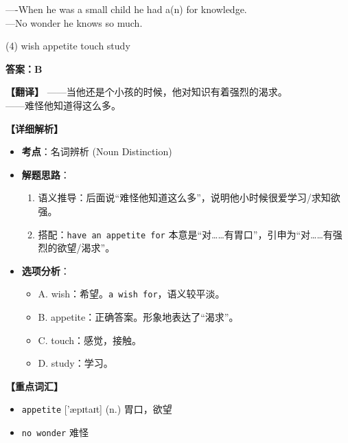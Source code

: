 \documentclass[11pt, a4paper]{article}
\newcommand{\analysis}[4]{
    \begin{solutionbox}
        \textbf{答案：#1}
        
        \textbf{【翻译】} #2
        
        \textbf{【详细解析】}
        #3
        
        \textbf{【重点词汇】}
        #4
    \end{solutionbox}
}
\newcommand{\blank}{\underline{\hspace{1.5cm}}}
\begin{document}
\begin{questions}
    \item ----When he was a small child he had a(n) \blank for knowledge. \\
    ---No wonder he knows so much.
    \begin{tasks}(4)
        \task wish \task appetite \task touch \task study
    \end{tasks}
    \analysis{B}{——当他还是个小孩的时候，他对知识有着强烈的渴求。\\——难怪他知道得这么多。}{
        \begin{itemize}
            \item \textbf{考点}：名词辨析 (Noun Distinction)
            \item \textbf{解题思路}：
                \begin{enumerate}
                    \item 语义推导：后面说“难怪他知道这么多”，说明他小时候很爱学习/求知欲强。
                    \item 搭配：\texttt{have an appetite for} 本意是“对……有胃口”，引申为“对……有强烈的欲望/渴求”。
                \end{enumerate}
            \item \textbf{选项分析}：
                \begin{itemize}
                    \item A. wish：希望。\texttt{a wish for}，语义较平淡。
                    \item B. appetite：正确答案。形象地表达了“渴求”。
                    \item C. touch：感觉，接触。
                    \item D. study：学习。
                \end{itemize}
        \end{itemize}
    }{
        \begin{itemize}
            \item \texttt{appetite} ['æpɪtaɪt] (n.) 胃口，欲望
            \item \texttt{no wonder} 难怪
        \end{itemize}
    }


\end{questions}
\end{document}
